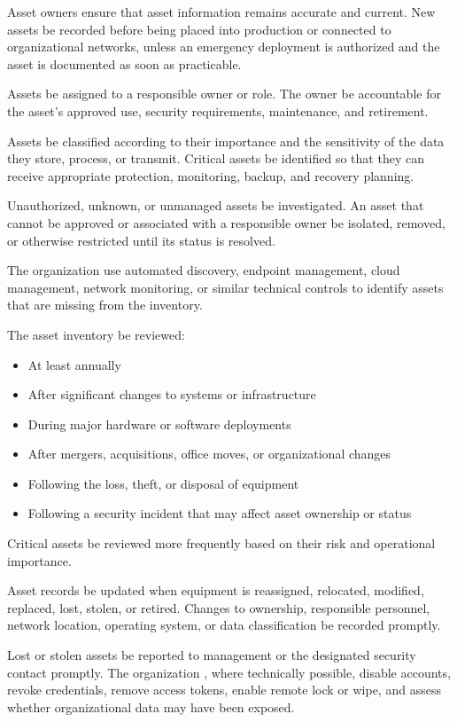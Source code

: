 Asset owners \must{} ensure that asset information remains accurate and current. New assets \must{} be recorded before being placed into production or connected to organizational networks, unless an emergency deployment is authorized and the asset is documented as soon as practicable.

Assets \must{} be assigned to a responsible owner or role. The owner \must{} be accountable for the asset's approved use, security requirements, maintenance, and retirement.

Assets \must{} be classified according to their importance and the sensitivity of the data they store, process, or transmit. Critical assets \must{} be identified so that they can receive appropriate protection, monitoring, backup, and recovery planning.

Unauthorized, unknown, or unmanaged assets \must{} be investigated. An asset that cannot be approved or associated with a responsible owner \must{} be isolated, removed, or otherwise restricted until its status is resolved.

The organization \should{} use automated discovery, endpoint management, cloud management, network monitoring, or similar technical controls to identify assets that are missing from the inventory.

The asset inventory \must{} be reviewed:
\begin{itemize}
    \item At least annually
    \item After significant changes to systems or infrastructure
    \item During major hardware or software deployments
    \item After mergers, acquisitions, office moves, or organizational changes
    \item Following the loss, theft, or disposal of equipment
    \item Following a security incident that may affect asset ownership or status
\end{itemize}

Critical assets \should{} be reviewed more frequently based on their risk and operational importance.

Asset records \must{} be updated when equipment is reassigned, relocated, modified, replaced, lost, stolen, or retired. Changes to ownership, responsible personnel, network location, operating system, or data classification \must{} be recorded promptly.

Lost or stolen assets \must{} be reported to management or the designated security contact promptly. The organization \must{}, where technically possible, disable accounts, revoke credentials, remove access tokens, enable remote lock or wipe, and assess whether organizational data may have been exposed.

